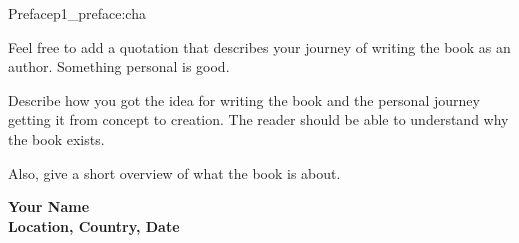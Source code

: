 


\begin{chapterpage}{Preface}{p1_preface:cha}

\begin{myquotation}
Feel free to add a quotation that describes your journey of writing the book as an author. Something personal is good.\end{myquotation}


\end{chapterpage}

Describe how you got the idea for writing the book and the personal journey getting it from concept to creation. The reader should be able to understand why the book exists.

Also, give a short overview of what the book is about.

\noindent \textbf{Your Name \\
Location, Country, Date\\}



\hfil{}\hfil





